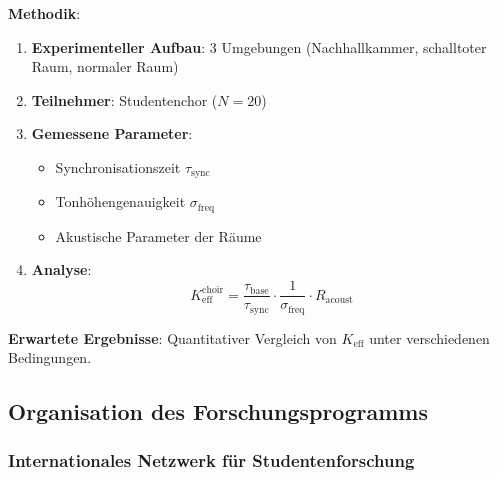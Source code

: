 \documentclass[12pt,a4paper]{article}
\begin{document}
	\textbf{Methodik}:
	\begin{enumerate}
		\item \textbf{Experimenteller Aufbau}: 3 Umgebungen (Nachhallkammer, schalltoter Raum, normaler Raum)
		\item \textbf{Teilnehmer}: Studentenchor ($N=20$)
		\item \textbf{Gemessene Parameter}:
		\begin{itemize}
			\item Synchronisationszeit $\tau_{\mathrm{sync}}$
			\item Tonhöhengenauigkeit $\sigma_{\mathrm{freq}}$
			\item Akustische Parameter der Räume
		\end{itemize}
		\item \textbf{Analyse}:
		\[
		K_{\mathrm{eff}}^{\mathrm{choir}} = \frac{\tau_{\mathrm{base}}}{\tau_{\mathrm{sync}}} \cdot \frac{1}{\sigma_{\mathrm{freq}}} \cdot R_{\mathrm{acoust}}
		\]
	\end{enumerate}
	
	\textbf{Erwartete Ergebnisse}: Quantitativer Vergleich von $K_{\mathrm{eff}}$ unter verschiedenen Bedingungen.
	
	\subsection{Organisation des Forschungsprogramms}
	
	\subsubsection{Internationales Netzwerk für Studentenforschung}
	
\end{document}
